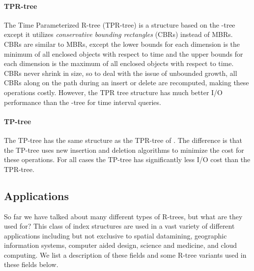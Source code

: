 \paragraph{TPR-tree} The Time Parameterized R-tree (TPR-tree) 
\cite{vsaltenis2000indexing} is a structure based on the \rstar-tree 
except it utilizes \emph{conservative bounding rectangles} (CBRs) 
instead of MBRs. CBRs are similar to MBRs, except the lower bounds for 
each dimension is the minimum of all enclosed objects with respect to 
time and the upper bounds for each dimension is the maximum of all 
enclosed objects with respect to time. CBRs never shrink in size, so to 
deal with the issue of unbounded growth, all CBRs along on the path 
during an insert or delete are recomputed, making these operations costly. 
However, the TPR tree structure has much better I/O performance than the 
\rstar-tree for time interval queries. 

\paragraph{TP\rstar-tree} The TP\rstar-tree \cite{tao2003tpr} has the same 
structure as the TPR-tree of \cite{vsaltenis2000indexing}. The difference
is that the TP\rstar-tree uses new insertion and deletion algorithms to 
minimize the cost for these operations. For all cases the TP\rstar-tree
has significantly less I/O cost than the TPR-tree. 


\subsection{Applications}
So far we have talked about many different types of R-trees, but what are they
used for? This class of index structures are used in a vast variety of different
applications including but not exclusive to spatial datamining, geographic 
information systems, computer aided design, science and medicine, and cloud 
computing. We list a description of these fields and some R-tree variants used 
in these fields below.


